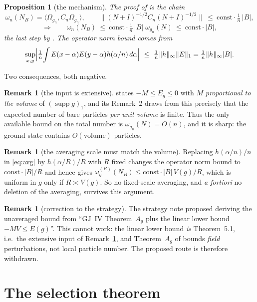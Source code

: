 \documentclass[11pt,a4paper]{article}
\theoremstyle{plain}
\newtheorem{proposition}[theorem]{Proposition}
\theoremstyle{definition}
\newtheorem{remark}[theorem]{Remark}
\newcommand{\Om}{\Omega}
\newcommand{\ip}[2]{\langle #1,#2\rangle}
\DeclareMathOperator{\supp}{supp}
\begin{document}
\begin{proposition}[the mechanism]\label{prop:mech}
The proof of \cite[Thm.~3.3.1(a)]{GJIII} is the chain
\[
  \omega_n(N_B)=\ip{\Om_{g_n}}{C_n\Om_{g_n}},\qquad
  \bigl\|(N+I)^{-1/2}C_n(N+I)^{-1/2}\bigr\|\ \le\ \mathrm{const}\cdot\tfrac1n\,|B| ,
\]
\[
  \Longrightarrow\qquad
  \omega_n(N_B)\ \le\ \mathrm{const}\cdot\tfrac1n\,|B|\;\omega_{g_n}(N)\ \le\ \mathrm{const}\cdot|B|,
\]
the last step by \cite[Thm.~5.1]{GJIII}. The operator norm bound comes from
\[
  \sup_{x,y}\Bigl|\tfrac1n\!\int E(x-\alpha)E(y-\alpha)h(\alpha/n)\,d\alpha\Bigr|
  \ \le\ \tfrac1n\|h\|_\infty\|E\|_1=\tfrac1n\|h\|_\infty|B| .
\]
\end{proposition}

Two consequences, both negative.

\begin{remark}[the input is extensive]\label{rem:extensive}
\cite[Thm.~5.1]{GJIII} states $-M\le E_g\le0$ with $M$ \emph{proportional to the volume} of
$(\supp g)_1$, and its Remark~2 draws from this precisely that the expected number of bare
particles \emph{per unit volume} is finite. Thus the only available bound on the total number is
$\omega_{g_n}(N)=O(n)$, and it is sharp: the ground state contains $O(\mathrm{volume})$ particles.
\end{remark}

\begin{remark}[the averaging scale must match the volume]\label{rem:scale}
Replacing $h(\alpha/n)/n$ in \eqref{eq:avg} by $h(\alpha/R)/R$ with $R$ fixed changes the operator
norm bound to $\mathrm{const}\cdot|B|/R$ and hence gives
$\omega^{(R)}_{g}(N_B)\le\mathrm{const}\cdot|B|\,V(g)/R$, which is uniform in $g$ only if
$R\asymp V(g)$. So no fixed-scale averaging, and \emph{a fortiori} no deletion of the averaging,
survives this argument.
\end{remark}

\begin{remark}[correction to the strategy]\label{rem:correction}
The strategy note proposed deriving the unaveraged bound from ``GJ~IV Theorem~$A_g$ plus the
linear lower bound $-MV\le E(g)$''. This cannot work: the linear lower bound \emph{is}
Theorem~5.1, i.e.\ the extensive input of Remark~\ref{rem:extensive}, and Theorem~$A_g$ of
\cite{GJIV} bounds \emph{field} perturbations, not local particle number. The proposed route is
therefore withdrawn.
\end{remark}

\section{The selection theorem}
\end{document}
